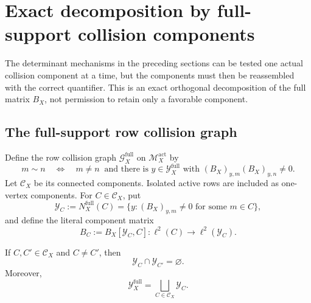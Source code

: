 \section{Exact decomposition by full-support collision components}
\label{sec:tpc67-componentwise}

The determinant mechanisms in the preceding sections can be tested one
actual collision component at a time, but the components must then be
reassembled with the correct quantifier.  This is an exact orthogonal
decomposition of the full matrix \(B_X\), not permission to retain only a
favorable component.

\subsection{The full-support row collision graph}

Define the row collision graph \(\mathscr G_X^{\mathrm{full}}\) on
\(\mathcal M_X^{\mathrm{act}}\) by
\begin{equation}
 m\sim n
 \quad\Longleftrightarrow\quad
 m\ne n
 \ \text{ and there is }y\in\mathcal Y_X^{\mathrm{full}}
 \text{ with }
 (B_X)_{y,m}(B_X)_{y,n}\ne0.
 \label{eq:tpc67-full-row-collision-graph}
\end{equation}
Let \(\mathscr C_X\) be its connected components.  Isolated active rows
are included as one-vertex components.  For \(C\in\mathscr C_X\), put
\begin{equation}
 \mathcal Y_C
 :=
 N_X^{\mathrm{full}}(C)
 =
 \{y:(B_X)_{y,m}\ne0
       \text{ for some }m\in C\},
 \label{eq:tpc67-component-output-set}
\end{equation}
and define the literal component matrix
\begin{equation}
 B_C:=B_X[\mathcal Y_C,C]:
 \ell^2(C)\longrightarrow\ell^2(\mathcal Y_C).
 \label{eq:tpc67-component-matrix}
\end{equation}

\begin{lemma}
\label{lem:tpc67-component-output-disjointness}
If \(C,C'\in\mathscr C_X\) and \(C\ne C'\), then
\begin{equation}
 \mathcal Y_C\cap\mathcal Y_{C'}=\varnothing.
 \label{eq:tpc67-disjoint-component-outputs}
\end{equation}
Moreover,
\begin{equation}
 \mathcal Y_X^{\mathrm{full}}
 =\bigsqcup_{C\in\mathscr C_X}\mathcal Y_C.
 \label{eq:tpc67-full-output-component-partition}
\end{equation}
\end{lemma}

